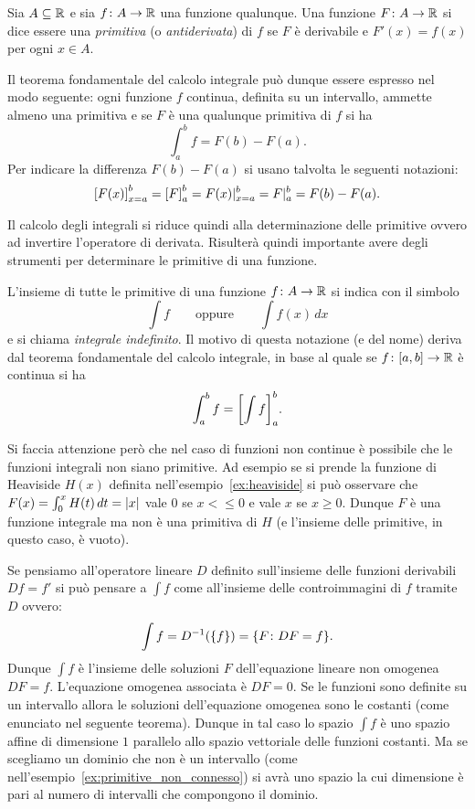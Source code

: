 \begin{definition}[primitiva]
\label{def:primitiva}%
\mymark{***}%
Sia $A \subseteq {\mathbb R}$ e sia $f\colon A \to {\mathbb R}$ una funzione qualunque.
Una funzione $F\colon A \to {\mathbb R}$ si dice essere una \emph{primitiva}%
%
(o \emph{antiderivata})
di $f$ se $F$ è derivabile e $F'(x)=f(x)$ per ogni $x\in A$.
\end{definition}

Il teorema fondamentale del calcolo integrale può dunque essere espresso nel
modo seguente: ogni funzione $f$ continua, definita su un intervallo,
ammette almeno una primitiva e se $F$ è una qualunque primitiva di $f$ si ha
\[
  \int_a^b f = F(b) - F(a).
\]
Per indicare la differenza $F(b)-F(a)$ si usano
talvolta le seguenti notazioni:
\[
  {\left[ F(x) \right]}_{x=a}^b = {\left[ F \right]}_a^b
  = F(x) \vert_{x=a}^b
  = F \vert_a^b = F(b) - F(a).
\]

Il calcolo degli integrali si riduce quindi alla determinazione delle primitive
ovvero ad invertire l'operatore di derivata.
Risulterà quindi importante avere degli strumenti per determinare le primitive
di una funzione.

\begin{definition}
\mymark{***}
L'insieme di tutte le primitive di una funzione $f\colon A \to {\mathbb R}$
si indica con il simbolo
\[
  \int f
  \qquad\text{oppure}\qquad
  \int f(x) \, dx
\]
e si chiama \emph{integrale indefinito}.
Il motivo di questa notazione (e del nome) deriva dal teorema fondamentale del
calcolo integrale, in
base al quale se $f\colon[a,b]\to {\mathbb R}$
è continua si ha
\[
  \int_a^b f = {\left[ \int f \right]}_a^b.
\]
\end{definition}

\begin{remark}
Si faccia attenzione però che nel caso di funzioni non continue è possibile
che le funzioni integrali non siano primitive. Ad esempio
se si prende la funzione di Heaviside $H(x)$ definita nell'esempio~\ref{ex:heaviside}
si può osservare che $F(x)=\int_0^x H(t)\, dt = {\left|x\right|}$
vale $0$ se $x<\le 0$ e vale $x$ se $x\ge 0$.
Dunque $F$ è una funzione integrale ma non è una primitiva di $H$
(e l'insieme delle primitive, in questo caso, è vuoto).
\end{remark}

Se pensiamo all'operatore lineare $D$ definito sull'insieme delle funzioni
derivabili $Df = f'$
si può pensare a $\int f$ come all'insieme delle controimmagini di $f$
tramite $D$ ovvero:
\[
  \int f = D^{-1}({\left\{ f \right\}}) = {\left\{ F \colon DF =f  \right\}}.
\]
Dunque $\int f$ è l'insieme delle soluzioni $F$ dell'equazione lineare
non omogenea $DF =f$. L'equazione omogenea associata è $DF = 0$.
Se le funzioni sono definite su un intervallo allora le soluzioni dell'equazione omogenea sono le costanti (come enunciato nel seguente teorema).
Dunque in tal caso lo spazio $\int f$ è uno spazio affine di dimensione $1$
parallelo allo spazio vettoriale delle funzioni costanti. 
Ma se scegliamo un dominio che non è un intervallo 
(come nell'esempio~\ref{ex:primitive_non_connesso}) 
si avrà uno spazio la cui dimensione è pari al numero di intervalli che compongono il dominio.

